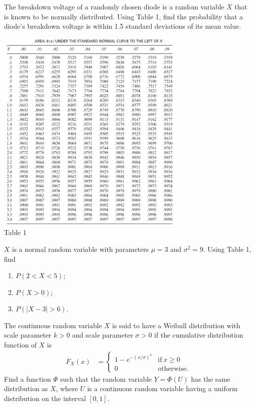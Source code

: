 \documentclass[10pt]{article}
\newenvironment{problem}[2][Problem]{\begin{trivlist}
\item[\hskip \labelsep {\bfseries #1}\hskip \labelsep {\bfseries #2.}]}{\end{trivlist}}
\begin{document}
\begin{problem}{7}
The breakdown voltage of a randomly chosen diode is a random variable $X$ that is known to be normally distributed. Using Table 1, find the probability that a diode’s breakdown voltage is within 1.5 standard deviations of its mean value.

\vspace{0.5cm}

\begin{center}
\includegraphics[height=10cm]{images/table1.png}
\\ Table 1
\end{center}

\vspace{0.2cm}

\end{problem}

\begin{problem}{8}
$X$ is a normal random variable with parameters $\mu = 3$ and $\sigma^2 = 9$. Using Table 1, find
\begin{enumerate}[label=(\alph*)]
\item $P(2 < X < 5)$;
\item $P(X > 0)$;
\item $P(|X - 3| > 6)$.
\end{enumerate}
\end{problem}

\begin{problem}{9}
The continuous random variable $X$ is said to have a Weibull distribution with scale parameter $k > 0$ and scale parameter $\sigma > 0$ if the cumulative distribution function of $X$ is
\begin{align*}
    F_X(x) &= 
    \begin{cases}
      1 - e^{-(x/\sigma)^k} & \text{if}\ x \geq 0 \\
      0 & \text{otherwise.}
    \end{cases}
\end{align*}
Find a function $\Phi$ such that the random variable $Y = \Phi(U)$ has the same distribution as $X$, where $U$ is a continuous random variable having a uniform distribution on the interval $[0,1]$.
\end{problem}
\end{document}
